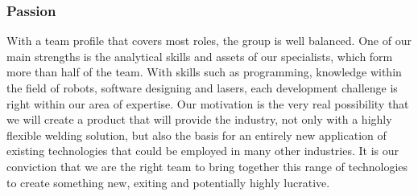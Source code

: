 \subsubsection{Passion}
With a team profile that covers most roles, the group is well balanced. One of our main strengths is the analytical skills and assets of our specialists, which form more than half of the team.  
With skills such as programming, knowledge within the field of robots, software designing and lasers, each development challenge is right within our area of expertise. 
Our motivation is the very real possibility that we will create a product that will provide the industry, not only with a highly flexible welding solution, but also the basis for an entirely new application of existing technologies that could be employed in many other industries.
It is our conviction that we are the right team to bring together this range of technologies to create something new, exiting and potentially highly lucrative.